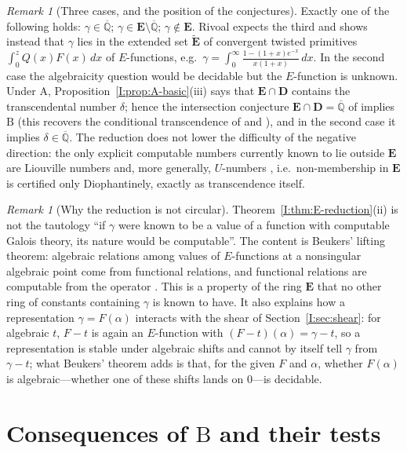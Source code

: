 \documentclass[11pt,a4paper]{article}
\newcommand{\Qbar}{\overline{\mathbb Q}}
\newcommand{\EE}{\mathbf E}
\newcommand{\DD}{\mathbf D}
\theoremstyle{definition}
\theoremstyle{remark}
\newtheorem{remark}[theorem]{Remark}
\numberwithin{equation}{section}
\begin{document}
\begin{remark}[Three cases, and the position of the conjectures]\label{I:rem:trichotomy}
Exactly one of the following holds: $\gamma\in\Qbar$; $\gamma\in\EE\setminus\Qbar$;
$\gamma\notin\EE$. Rivoal \cite{Rivoal2017} expects the third and shows instead that
$\gamma$ lies in the extended set $\widetilde{\EE}$ of convergent twisted primitives
$\int_0^zQ(x)F(x)\,dx$ of $E$-functions, e.g.\
$\gamma=\int_0^\infty\frac{1-(1+x)e^{-x}}{x(1+x)}\,dx$. In the second case the
algebraicity question would be decidable but the $E$-function is unknown. Under
$\mathrm A$, Proposition~\ref{I:prop:A-basic}(iii) says that $\EE\cap\DD$ contains the
transcendental number $\delta$; hence the intersection conjecture $\EE\cap\DD=\Qbar$ of
\cite{FRmixed} implies $\mathrm B$ (this recovers the conditional transcendence of
\cite{FRmixed} and \cite[Thm.~``Conditional simultaneous dilation theorem'']{K002}),
and in the second case it implies $\delta\in\Qbar$. The reduction does not lower the
difficulty of the negative direction: the only explicit computable numbers currently
known to lie outside $\EE$ are Liouville numbers and, more generally, $U$-numbers
\cite[Cor.~1, 3]{FRliouville}, i.e.\ non-membership in $\EE$ is certified only
Diophantinely, exactly as transcendence itself.
\end{remark}

\begin{remark}[Why the reduction is not circular]
Theorem~\ref{I:thm:E-reduction}(ii) is not the tautology ``if $\gamma$ were known to be a
value of a function with computable Galois theory, its nature would be computable''. The
content is Beukers' lifting theorem: algebraic relations among values of $E$-functions at
a nonsingular algebraic point come from functional relations, and functional relations
are computable from the operator \cite{Beukers,AR,BRS}. This is a property of the ring
$\EE$ that no other ring of constants containing $\gamma$ is known to have. It also
explains how a representation $\gamma=F(\alpha)$ interacts with the shear of
Section~\ref{I:sec:shear}: for algebraic $t$, $F-t$ is again an $E$-function with
$(F-t)(\alpha)=\gamma-t$, so a representation is stable under algebraic shifts and
cannot by itself tell $\gamma$ from $\gamma-t$; what Beukers' theorem adds is that, for
the given $F$ and $\alpha$, whether $F(\alpha)$ is algebraic---whether one of these
shifts lands on $0$---is decidable.
\end{remark}

\section{Consequences of $\mathrm B$ and their tests}\label{I:sec:B}
\end{document}
